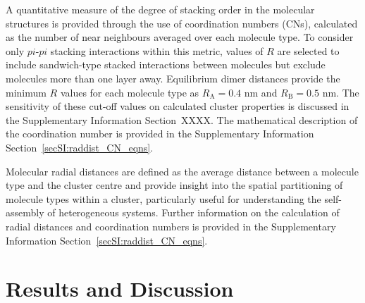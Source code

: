 A quantitative measure of the degree of stacking order in the molecular structures is provided through the use of coordination numbers (CNs), calculated as the number of near neighbours averaged over each molecule type. To consider only $pi$-$pi$ stacking interactions within this metric, values of $R$ are selected to include sandwich-type stacked interactions between molecules but exclude molecules more than one layer away. Equilibrium dimer distances provide the minimum $R$ values for each molecule type as $R_{\text{A}} = 0.4$ nm and $R_{\text{B}} = 0.5$ nm. The sensitivity of these cut-off values on calculated cluster properties is discussed in the Supplementary Information Section~XXXX. The mathematical description of the coordination number is provided in the Supplementary Information Section~\ref{secSI:raddist_CN_eqns}.

Molecular radial distances are defined as the average distance between a molecule type and the cluster centre and provide insight into the spatial partitioning of molecule types within a cluster, particularly useful for understanding the self-assembly of heterogeneous systems. Further information on the calculation of radial distances and coordination numbers is provided in the Supplementary Information Section~\ref{secSI:raddist_CN_eqns}.



\section{Results and Discussion}
%
